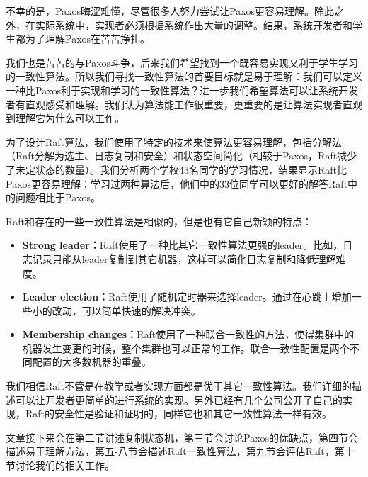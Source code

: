 \documentclass[journal]{IEEEtran}
\begin{document}
不幸的是，Paxos晦涩难懂，尽管很多人努力尝试让Paxos更容易理解。除此之外，在实际系统中，实现者必须根据系统作出大量的调整。结果，系统开发者和学生都为了理解Paxos在苦苦挣扎。


我们也是苦苦的与Paxos斗争，后来我们希望找到一个既容易实现又利于学生学习的一致性算法。所以我们寻找一致性算法的首要目标就是易于理解：我们可以定义一种比Paxos利于实现和学习的一致性算法？进一步我们希望算法可以让系统开发者有直观感受和理解。我们认为算法能工作很重要，更重要的是让算法实现者直观到理解它为什么可以工作。


为了设计Raft算法，我们使用了特定的技术来使算法更容易理解，包括分解法（Raft分解为选主、日志复制和安全）和状态空间简化（相较于Paxos，Raft减少了未定状态的数量）。我们分析两个学校43名同学的学习情况，结果显示Raft比Paxos更容易理解：学习过两种算法后，他们中的33位同学可以更好的解答Raft中的问题相比于Paxos。


Raft和存在的一些一致性算法是相似的，但是也有它自己新颖的特点：
\begin{itemize}
\item \textbf{Strong leader：}Raft使用了一种比其它一致性算法更强的leader。比如，日志记录只能从leader复制到其它机器，这样可以简化日志复制和降低理解难度。
\item \textbf{Leader election：}Raft使用了随机定时器来选择leader。通过在心跳上增加一些小的改动，可以简单快速的解决冲突。
\item \textbf{Membership changes：}Raft使用了一种联合一致性的方法，使得集群中的机器发生变更的时候，整个集群也可以正常的工作。联合一致性配置是两个不同配置的大多数机器的重叠。
\end{itemize}


我们相信Raft不管是在教学或者实现方面都是优于其它一致性算法。我们详细的描述可以让开发者更简单的进行系统的实现。另外已经有几个公司公开了自己的实现，Raft的安全性是验证和证明的，同样它也和其它一致性算法一样有效。


文章接下来会在第二节讲述复制状态机，第三节会讨论Paxos的优缺点，第四节会描述易于理解方法，第五-八节会描述Raft一致性算法，第九节会评估Raft，第十节讨论我们的相关工作。
\end{document}
